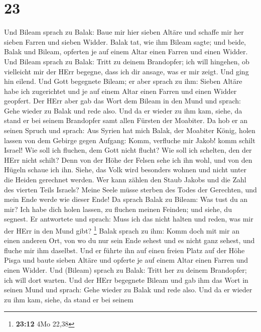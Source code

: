\hypertarget{section-4}{%
\section{23}\label{section-4}}

 Und Bileam sprach zu Balak: Baue mir hier sieben Altäre und
schaffe mir her sieben Farren und sieben Widder.  Balak tat,
wie ihm Bileam sagte; und beide, Balak und Bileam, opferten je auf einem
Altar einen Farren und einen Widder.  Und Bileam sprach zu
Balak: Tritt zu deinem Brandopfer; ich will hingehen, ob vielleicht mir
der HErr begegne, dass ich dir ansage, was er mir zeigt. Und ging hin
eilend.  Und Gott begegnete Bileam; er aber sprach zu ihm:
Sieben Altäre habe ich zugerichtet und je auf einem Altar einen Farren
und einen Widder geopfert.  Der HErr aber gab das Wort dem
Bileam in den Mund und sprach: Gehe wieder zu Balak und rede also.
 Und da er wieder zu ihm kam, siehe, da stand er bei seinem
Brandopfer samt allen Fürsten der Moabiter.  Da hob er an
seinen Spruch und sprach: Aus Syrien hat mich Balak, der Moabiter König,
holen lassen von dem Gebirge gegen Aufgang: Komm, verfluche mir Jakob!
komm schilt Israel!  Wie soll ich fluchen, dem Gott nicht
flucht? Wie soll ich schelten, den der HErr nicht schilt? 
Denn von der Höhe der Felsen sehe ich ihn wohl, und von den Hügeln
schaue ich ihn. Siehe, das Volk wird besonders wohnen und nicht unter
die Heiden gerechnet werden.  Wer kann zählen den Staub
Jakobs und die Zahl des vierten Teils Israels? Meine Seele müsse sterben
des Todes der Gerechten, und mein Ende werde wie dieser Ende!
 Da sprach Balak zu Bileam: Was tust du an mir? Ich habe
dich holen lassen, zu fluchen meinen Feinden; und siehe, du segnest.
 Er antwortete und sprach: Muss ich das nicht halten und
reden, was mir der HErr in den Mund gibt? \footnote{\textbf{23:12} 4Mo
  22,38}  Balak sprach zu ihm: Komm doch mit mir an einen
anderen Ort, von wo du nur sein Ende sehest und es nicht ganz sehest,
und fluche mir ihm daselbst.  Und er führte ihn auf einen
freien Platz auf der Höhe Pisga und baute sieben Altäre und opferte je
auf einem Altar einen Farren und einen Widder.  Und
(Bileam) sprach zu Balak: Tritt her zu deinem Brandopfer; ich will dort
warten.  Und der HErr begegnete Bileam und gab ihm das Wort
in seinen Mund und sprach: Gehe wieder zu Balak und rede also.
 Und da er wieder zu ihm kam, siehe, da stand er bei seinem
